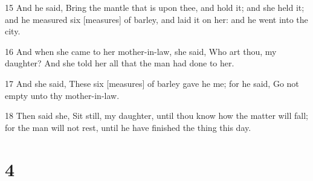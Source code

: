 \par 15 And he said, Bring the mantle that is upon thee, and hold it; and she held it; and he measured six [measures] of barley, and laid it on her: and he went into the city.
\par 16 And when she came to her mother-in-law, she said, Who art thou, my daughter? And she told her all that the man had done to her.
\par 17 And she said, These six [measures] of barley gave he me; for he said, Go not empty unto thy mother-in-law.
\par 18 Then said she, Sit still, my daughter, until thou know how the matter will fall; for the man will not rest, until he have finished the thing this day.

\chapter{4}

